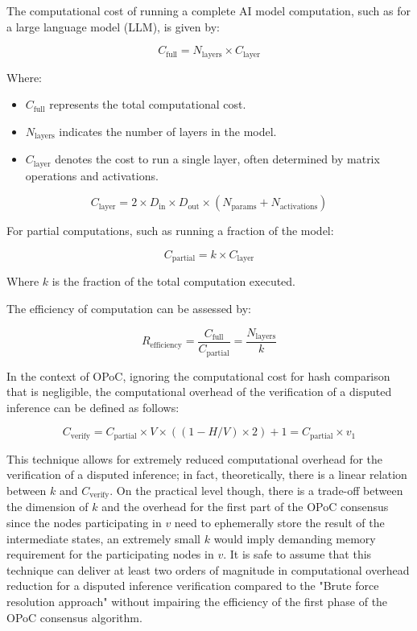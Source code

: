 \documentclass{article}
\begin{document}
The computational cost of running a complete AI model computation, such as for a large language model (LLM), is given by:

\[ C_{\text{full}} = N_{\text{layers}} \times C_{\text{layer}} \]

Where:
\begin{itemize}
\item \( C_{\text{full}} \) represents the total computational cost.
\item \( N_{\text{layers}} \) indicates the number of layers in the model.
\item \( C_{\text{layer}} \) denotes the cost to run a single layer, often determined by matrix operations and activations.
\end{itemize}


\[ C_{\text{layer}} = 2 \times D_{\text{in}} \times D_{\text{out}} \times (N_{\text{params}} + N_{\text{activations}}) \]


For partial computations, such as running a fraction of the model:

\[ C_{\text{partial}} = k \times C_{\text{layer}} \]

Where \( k \) is the fraction of the total computation executed.


The efficiency of computation can be assessed by:

\[ R_{\text{efficiency}} = \frac{C_{\text{full}}}{C_{\text{partial}}} = \frac{N_{\text{layers}}}{k} \]

In the context of OPoC, ignoring the computational cost for hash comparison that is negligible, the computational overhead of the verification of a disputed inference can be defined as follows:

\[ C_{\text{verify}} = C_{\text{partial}} \times V \times \left((1 - H/V) \times 2\right) + 1 = C_{\text{partial}} \times  v_1 \]

This technique allows for extremely reduced computational overhead for the verification of a disputed inference; in fact, theoretically, there is a linear relation between \(k\) and \(C_{\text{verify}}\). On the practical level though, there is a trade-off between the dimension of \(k\) and the overhead for the first part of the OPoC consensus since the nodes participating in \(v\) need to ephemerally store the result of the intermediate states, an extremely small \(k\) would imply demanding memory requirement for the participating nodes in \(v\). It is safe to assume that this technique can deliver at least two orders of magnitude in computational overhead reduction for a disputed inference verification compared to the "Brute force resolution approach" without impairing the efficiency of the first phase of the OPoC consensus algorithm.
\end{document}
